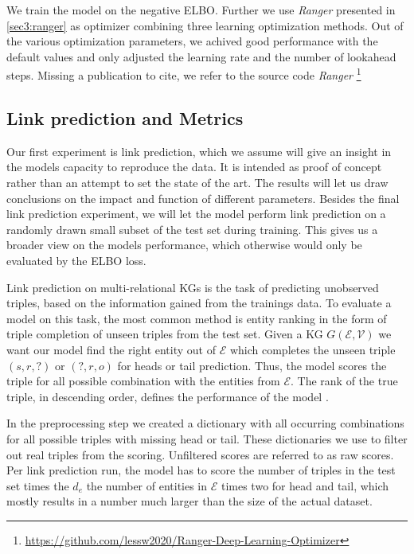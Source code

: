 We train the model on the negative ELBO. Further we use \textit{Ranger} presented in \ref{sec3:ranger} as optimizer combining three learning optimization methods. Out of the various optimization parameters, we achived good performance with the default values and  only adjusted the learning rate and the number of lookahead steps. Missing a publication to cite, we refer to the source code \textit{Ranger} \footnote{\url{https://github.com/lessw2020/Ranger-Deep-Learning-Optimizer}}



\subsection{Link prediction and Metrics}
\label{ssec4:lpmetrics}
Our first experiment is link prediction, which we assume will give an insight in the models capacity to reproduce the data. It is intended as proof of concept rather than an attempt to set the state of the art. The results will let us draw conclusions on the impact and function of different parameters.
Besides the final link prediction experiment, we will let the model perform link prediction on a randomly drawn small subset of the test set during training. This gives us a broader view on the models performance, which otherwise would only be evaluated by the ELBO loss.  

Link prediction on multi-relational KGs is the task of predicting unobserved triples, based on the information gained from the trainings data. To evaluate a model on this task, the most common method is entity ranking in the form of triple completion of unseen triples from the test set. Given a KG $G(\mathcal{E},\mathcal{V})$ we want our model find the right entity out of $\mathcal{E}$ which completes the unseen triple $(s,r,?)$ or $(?,r,o)$ for heads or tail prediction. Thus, the model scores the triple for all possible combination with the entities from $\mathcal{E}$. The rank of the true triple, in descending order, defines the performance of the model \cite{ruffinelli_you_2019}.

In the preprocessing step we created a dictionary with all occurring combinations for all possible triples with missing head or tail. These dictionaries we use to filter out real triples from the scoring. Unfiltered scores are referred to as raw scores. Per link prediction run, the model has to score the number of triples in the test set times the $d_e$ the number of entities in $\mathcal{E}$ times two for head and tail, which mostly results in a number much larger than the size of the actual dataset.

